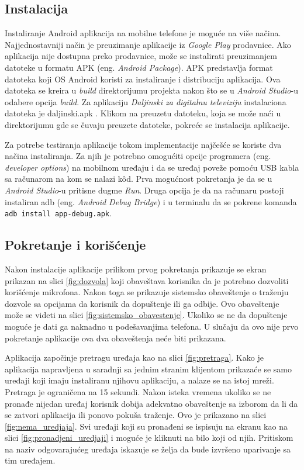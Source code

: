 \documentclass[implementacija.tex]{subfiles}
\begin{document}
\subsection{Instalacija}
Instaliranje Android aplikacija na mobilne telefone je moguće na više načina. Najjednostavniji način je preuzimanje aplikacije iz \textit{Google Play} prodavnice. Ako aplikacija nije dostupna preko prodavnice, može se instalirati preuzimanjem datoteke u formatu APK (eng. \textit{Android Package}). APK predstavlja format datoteka koji OS Android koristi za instaliranje i distribuciju aplikacija. Ova datoteka se kreira u \textit{build} direktorijumu projekta nakon što se u \textit{Android Studio}-u odabere opcija \textit{build}. Za aplikaciju \textit{Daljinski za digitalnu televiziju} instalaciona datoteka je daljinski.apk \cite{sajt:daljiskiApk}. Klikom na preuzetu datoteku, koja se može naći u direktorijumu gde se čuvaju preuzete datoteke, pokreće se instalacija aplikacije.

Za potrebe testiranja aplikacije tokom implementacije najčešće se koriste dva načina instaliranja. Za njih je potrebno omogućiti opcije programera (eng. \textit{developer options}) na mobilnom uređaju i da se uređaj poveže pomoću USB kabla sa računarom na kom se nalazi k\^{o}d. Prva mogućnost pokretanja je da se u \textit{Android Studio}-u pritisne dugme \textit{Run}. Druga opcija je da na računaru postoji instaliran adb (eng. \textit{Android Debug Bridge}) i u terminalu da se pokrene komanda \verb|adb install app-debug.apk|. 

\subsection{Pokretanje i korišćenje}

Nakon instalacije aplikacije prilikom prvog pokretanja prikazuje se ekran prikazan na slici \ref{fig:dozvola} koji obaveštava korisnika da je potrebno dozvoliti korišćenje mikrofona. Nakon toga se prikazuje sistemsko obaveštenje o traženju dozvole sa opcijama da korisnik da dopuštenje ili ga odbije. Ovo obaveštenje može se videti na slici \ref{fig:sistemsko_obavestenje}. Ukoliko se ne da dopuštenje moguće je dati ga naknadno u podešavanjima telefona. U slučaju da ovo nije prvo pokretanje aplikacije ova dva obaveštenja neće biti prikazana.

Aplikacija započinje pretragu uređaja kao na slici \ref{fig:pretraga}. Kako je aplikacija napravljena u saradnji sa jednim stranim klijentom prikazaće se samo uređaji koji imaju instaliranu njihovu aplikaciju, a nalaze se na istoj mreži. Pretraga je ograničena na 15 sekundi. Nakon isteka vremena ukoliko se ne pronađe nijedan uređaj korisnik dobija adekvatno obaveštenje sa izborom da li da se zatvori aplikacija ili ponovo pokuša traženje. Ovo je prikazano na slici \ref{fig:nema_uredjaja}. 
Svi uređaji koji su pronađeni se ispisuju na ekranu kao na slici \ref{fig:pronadjeni_uredjaji} i moguće je kliknuti na bilo koji od njih. Pritiskom na naziv odgovarajućeg uređaja iskazuje se želja da bude izvršeno uparivanje sa tim uređajem.
\end{document}
